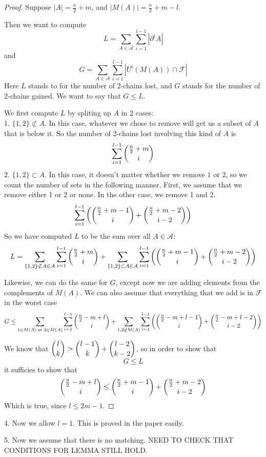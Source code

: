\documentclass[11pt]{amsart}
\theoremstyle{definition}
\theoremstyle{remark}
\newcommand{\F}{\mathcal{F}}
\newcommand{\A}{\mathcal{A}}
\begin{document}
\begin{proof}
Suppose $|A| = \frac{n}{2} + m$, and $|M(A)| = \frac{n}{2} + m - l$.

Then we want to compute
\[L = \sum_{A \in \A} \sum_{i=1}^{l-1} |\partial^iA| \]
and 
\[G = \sum_{A \in \A} \sum_{i=1}^{l-1} |U^i(M(A)) \cap \F| \]
Here $L$ stands to for the number of 2-chains lost, and $G$ stands for the number of 2-chains gained. We want to say that $G \leq L$. 

We first compute $L$ by spliting up $A$ in 2 cases:\\
1. $\{ 1, 2 \} \not\subset A$. In this case, whatever we chose to remove will get us a subset of $A$ that is below it. So the number of 2-chains lost involving this kind of $A$ is
\[ \sum_{i=1}^{l-1} \dbinom{\frac{n}{2} + m}{i} \]
2. $\{ 1, 2 \} \subset A$. In this case, it doesn't matter whether we remove $1$ or $2$, so we count the number of sets in the following manner. First, we assume that we remove either 1 or 2 or none. In the other case, we remove 1 and 2.
\[ \sum_{i=1}^{l-1} \left(\dbinom{\frac{n}{2} + m - 1}{i} + \dbinom{\frac{n}{2}+m-2}{i-2} \right) \]
So we have computed $L$ to be the sum over all $A \in \A$:
\[ L = \sum_{\{1, 2\} \not\subset A \in \A} \sum_{i=1}^{l-1} \dbinom{\frac{n}{2} + m}{i} + \sum_{\{1, 2\} \subset A \in \A} \sum_{i=1}^{l-1} \left( \dbinom{\frac{n}{2}+m-1}{i} + \dbinom{\frac{n}{2}+m-2}{i-2}\right) \]

Likewise, we can do the same for $G$, except now we are adding elements from the complements of $M(A)$. We can also assume that everything that we add is in $\F$ in the worst case
\[ G \leq \sum_{1 \in M(A) \text{ or } 2 \in M(A)} \sum_{i=1}^{l-1} \dbinom{\frac{n}{2}-m+l}{i} + \sum_{1, 2 \notin M(A)} \sum_{i=1}^{l-1} \left( \dbinom{\frac{n}{2}-m+l-1}{i} + \dbinom{\frac{n}{2}-m+l-2}{i-2} \right) \]

We know that $\dbinom{l}{k} > \dbinom{l-1}{k} + \dbinom{l-2}{k-2}$, so in order to show that 
\[ G \leq L \]
it sufficies to show that
\[ \dbinom{\frac{n}{2}-m+l}{i} \leq \dbinom{\frac{n}{2}+m-1}{i} + \dbinom{\frac{n}{2}+m-2}{i-2} \]
Which is true, since $l \leq 2m-1$.
\end{proof}

4. Now we allow $l = 1$. This is proved in the paper easily. 

5. Now we assume that there is no matching. NEED TO CHECK THAT CONDITIONS FOR LEMMA STILL HOLD.
\end{document}
